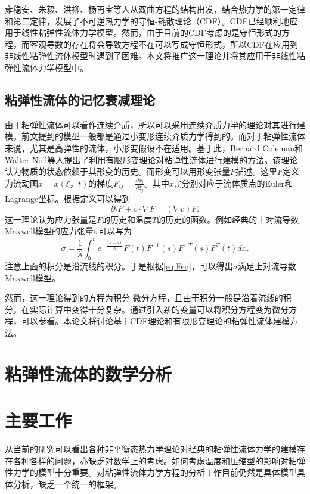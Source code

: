 \documentclass{article}
\begin{document}
雍稳安、朱毅、洪柳、杨再宝等人从双曲方程的结构出发，结合热力学的第一定律和第二定律，发展了不可逆热力学的守恒-耗散理论（CDF）\cite{}。CDF已经顺利地应用于线性粘弹性流体力学模型。然而，由于目前的CDF考虑的是守恒形式的方程，而客观导数的存在将会导致方程不在可以写成守恒形式，所以CDF在应用到非线性粘弹性流体模型时遇到了困难。本文将推广这一理论并将其应用于非线性粘弹性流体力学模型中。

\subsection{粘弹性流体的记忆衰减理论}
由于粘弹性流体可以看作连续介质，所以可以采用连续介质力学的理论对其进行建模。前文提到的模型一般都是通过小变形连续介质力学得到的。而对于粘弹性流体来说，尤其是高弹性的流体，小形变假设不在适用。基于此，Bernard Coleman和Walter Noll等人提出了利用有限形变理论对粘弹性流体进行建模的方法\cite{}。该理论认为物质的状态依赖于其形变的历史。而形变可以用形变张量$F$描述。这里$F$定义为流动图$x = x(\xi，t)$的梯度$F_{ij} = \frac{\partial x_i}{\partial \xi_j}$。其中$x,\xi$分别对应于流体质点的Euler和Lagrange坐标。根据定义可以得到
\begin{equation}\label{eq:Feq}
	\partial_t F + v \cdot \nabla F = (\nabla v) F.
\end{equation}
这一理论认为应力张量是$F$的历史和温度$T$的历史的函数。例如经典的上对流导数Maxwell模型的应力张量$\sigma$可以写为
\begin{equation*}
	\sigma = \frac{1}{\lambda} \int_{0}^{t} e^{-\frac{(t-s)}{\lambda} } F(t)  F^{-1}(s) F^{-T}(s) F^T(t)  dx.
\end{equation*}
注意上面的积分是沿流线的积分。于是根据\eqref{eq:Feq}，可以得出$\sigma$满足上对流导数Maxwell模型。

然而，这一理论得到的方程为积分-微分方程，且由于积分一般是沿着流线的积分，在实际计算中变得十分复杂。通过引入新的变量可以将积分方程变为微分方程，可以参看\cite{}。本论文将讨论基于CDF理论和有限形变理论的粘弹性流体建模方法。
\section{粘弹性流体的数学分析}

\section{主要工作}
从当前的研究可以看出各种非平衡态热力学理论对经典的粘弹性流体力学的建模存在各种各样的问题，亦缺乏对数学上的考虑。如何考虑温度和压缩型的影响对粘弹性力学的模型十分重要。对粘弹性流体力学方程的分析工作目前仍然是具体模型具体分析，缺乏一个统一的框架。
\end{document}
